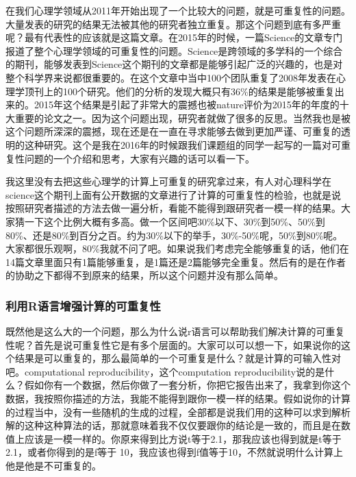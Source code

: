 \documentclass[
  oneside]{book}
\begin{document}
在我们心理学领域从2011年开始出现了一个比较大的问题，就是可重复性的问题。大量发表的研究的结果无法被其他的研究者独立重复。那这个问题到底有多严重呢？最有代表性的应该就是这篇文章。在2015年的时候，一篇Science的文章专门报道了整个心理学领域的可重复性的问题。Science是跨领域的多学科的一个综合的期刊，能够发表到Science这个期刊的文章都是能够引起广泛的兴趣的，也是对整个科学界来说都很重要的。在这个文章中当中100个团队重复了2008年发表在心理学顶刊上的100个研究。他们的分析的发现大概只有36\%的结果是能够被重复出来的。2015年这个结果是引起了非常大的震撼也被nature评价为2015年的年度的十大重要的论文之一。因为这个问题出现，研究者就做了很多的反思。当然我也是被这个问题所深深的震撼，现在还是在一直在寻求能够去做到更加严谨、可重复的透明的这种研究。这个是我在2016年的时候跟我们课题组的同学一起写的一篇对可重复性问题的一个介绍和思考，大家有兴趣的话可以看一下。

我这里没有去把这些心理学的计算上可重复的研究拿过来，有人对心理科学在science这个期刊上面有公开数据的文章进行了计算的可重复性的检验，也就是说按照研究者描述的方法去做一遍分析，看能不能得到跟研究者一模一样的结果。大家猜一下这个比例大概有多高。做一个区间吧30\%以下、30\%到50\%、50\%到80\%、还是80\%到百分之百。约为30\%以下的举手，30\%-50\%呢，50\%到80\%呢。大家都很乐观啊，80\%我就不问了吧。如果说我们考虑完全能够重复的话，他们在14篇文章里面只有1篇能够重复，是1篇还是2篇能够完全重复。然后有的是在作者的协助之下都得不到原来的结果，所以这个问题并没有那么简单。

\hypertarget{ux5229ux7528rux8bedux8a00ux589eux5f3aux8ba1ux7b97ux7684ux53efux91cdux590dux6027}{%
\subsubsection{利用R语言增强计算的可重复性}\label{ux5229ux7528rux8bedux8a00ux589eux5f3aux8ba1ux7b97ux7684ux53efux91cdux590dux6027}}

既然他是这么大的一个问题，那么为什么说r语言可以帮助我们解决计算的可重复性呢？首先是说可重复性它是有多个层面的。大家可以可以想一下，如果说你的这个结果是可以重复的，那么最简单的一个可重复是什么？就是计算的可输入性对吧。computational reproducibility，这个computation reproducibility说的是什么？假如你有一个数据，然后你做了一套分析，你把它报告出来了，我拿到你这个数据，我按照你描述的方法，我能不能得到跟你一模一样的结果。假如说你的计算的过程当中，没有一些随机的生成的过程，全部都是说我们用的这种可以求到解析解的这种这种算法的话，那就意味着我不仅仅要跟你的结论是一致的，而且是在数值上应该是一模一样的。你原来得到比方说t等于2.1，那我应该也得到就是t等于2.1，或者你得到的是f等于 10，我应该也得到f值等于10，不然就说明什么计算上他是他是不可重复的。
\end{document}
